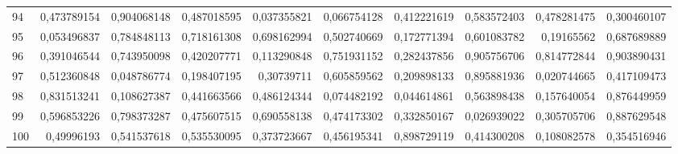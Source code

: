 \documentclass{article}
\begin{document}
\begin{landscape}
\begin{longtable}{lrrrrrrrrr}
94	&	0,473789154	&	0,904068148	&	0,487018595	&	0,037355821	&	0,066754128	&	0,412221619	&	0,583572403	&	0,478281475	&	0,300460107	\\
95	&	0,053496837	&	0,784848113	&	0,718161308	&	0,698162994	&	0,502740669	&	0,172771394	&	0,601083782	&	0,19165562	&	0,687689889	\\
96	&	0,391046544	&	0,743950098	&	0,420207771	&	0,113290848	&	0,751931152	&	0,282437856	&	0,905756706	&	0,814772844	&	0,903890431	\\
97	&	0,512360848	&	0,048786774	&	0,198407195	&	0,30739711	&	0,605859562	&	0,209898133	&	0,895881936	&	0,020744665	&	0,417109473	\\
98	&	0,831513241	&	0,108627387	&	0,441663566	&	0,486124344	&	0,074482192	&	0,044614861	&	0,563898438	&	0,157640054	&	0,876449959	\\
99	&	0,596853226	&	0,798373287	&	0,475607515	&	0,690558138	&	0,474173302	&	0,332850167	&	0,026939022	&	0,305705706	&	0,887629548	\\
100	&	0,49996193	&	0,541537618	&	0,535530095	&	0,373723667	&	0,456195341	&	0,898729119	&	0,414300208	&	0,108082578	&	0,354516946	\\
\end{longtable}
\end{landscape}
 
\end{document}
